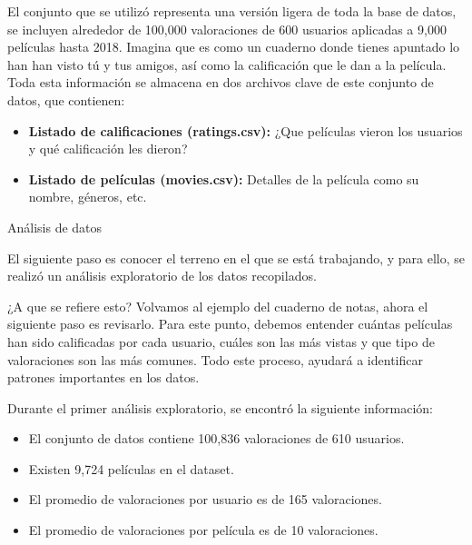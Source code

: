 \documentclass[letterpaper,10pt,final,hyphenatedtitles]{papertexKS}
\begin{document}
\begin{news}{2}
	\begin{center}
	\end{center}

	El conjunto que se utilizó representa una versión ligera de toda la base de datos, se incluyen alrededor de 100,000 valoraciones de 600 usuarios aplicadas a 9,000 películas hasta 2018. Imagina que es como un cuaderno donde tienes apuntado lo han han visto tú y tus amigos, así como la calificación que le dan a la película. Toda esta información se almacena en dos archivos clave de este conjunto de datos, que contienen:

	\begin{itemize}
		\item \textbf{Listado de calificaciones (ratings.csv):} ¿Que películas vieron los usuarios y qué calificación les dieron?
		\item \textbf{Listado de películas (movies.csv):} Detalles de la película como su nombre, géneros, etc.
	\end{itemize}
    
	\noindent\textcolor{color}{\Large{Análisis de datos}}

	El siguiente paso es conocer el terreno en el que se está trabajando, y para ello, se realizó un análisis exploratorio de los datos recopilados.

	¿A que se refiere esto? Volvamos al ejemplo del cuaderno de notas, ahora el siguiente paso es revisarlo. Para este punto, debemos entender cuántas películas han sido calificadas por cada usuario, cuáles son las más vistas y que tipo de valoraciones son las más comunes. Todo  este proceso, ayudará a identificar patrones importantes en los datos.

	Durante el primer análisis exploratorio, se encontró la siguiente información:

	\begin{itemize}
		\item El conjunto de datos contiene 100,836 valoraciones de 610 usuarios. 
		\item Existen 9,724 películas en el dataset.
		\item El promedio de valoraciones por usuario es de 165 valoraciones.
		\item El promedio de valoraciones por película es de 10 valoraciones.
	\end{itemize}


\end{news}
\end{document}

